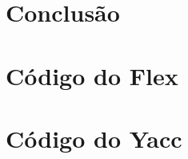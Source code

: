 \documentclass{llncs}
\begin{document}
\section{Conclusão}

\appendix
\section{Código do Flex}
\small
\begin{changemargin}{-4cm}{-4cm}

\end{changemargin}

\normalsize
\section{Código do Yacc}
\small
\begin{changemargin}{-4cm}{-4cm}

\end{changemargin}
\end{document}
